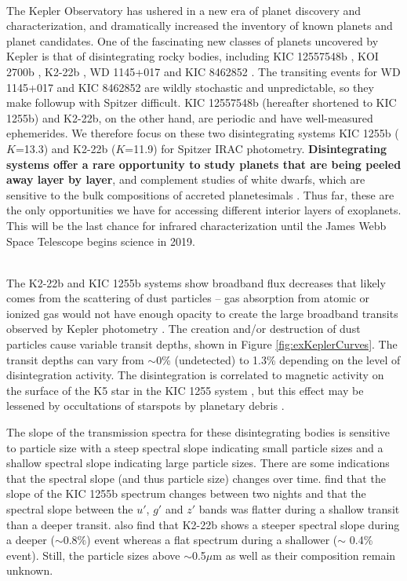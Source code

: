 \documentclass[letterpaper,12pt]{article}
\begin{document}
\\
The Kepler Observatory has ushered in a new era of planet discovery and characterization, and dramatically increased the inventory of known planets and planet candidates.
One of the fascinating new classes of planets uncovered by Kepler is that of disintegrating rocky bodies,
including KIC 12557548b \citep{rappaport}, KOI 2700b \citep{rappaport2014KOI2700}, K2-22b \citep{sanchis-ojedak2-22}, WD 1145+017 \citep{vanderburg2015wdDisintegrating} and KIC 8462852 \citep{boyajian846}.
The transiting events for WD 1145+017 and KIC 8462852 are wildly stochastic and unpredictable, so they make followup with Spitzer difficult.
KIC 12557548b (hereafter shortened to KIC 1255b) and K2-22b, on the other hand, are periodic and have well-measured ephemerides.
We therefore focus on these two disintegrating systems KIC 1255b ($K$=13.3) and K2-22b ($K$=11.9) for Spitzer IRAC photometry.
\textbf{Disintegrating systems offer a rare opportunity to study planets that are being peeled away layer by layer}, and complement studies of white dwarfs, which are sensitive to the bulk compositions of accreted planetesimals \cite[e.g.][]{jura2003wdPollution}.
Thus far, these are the only opportunities we have for accessing different interior layers of exoplanets.
This will be the last chance for infrared characterization until the James Webb Space Telescope begins science in 2019.\newline

\\
The K2-22b and KIC 1255b systems show broadband flux decreases that likely comes from the scattering of dust particles -- gas absorption from atomic or ionized gas would not have enough opacity to create the large broadband transits observed by Kepler photometry \citep[0.42 $\mu$m to 0.90 $\mu$m bandpass;][]{koch2010keplerChar}.
The creation and/or destruction of dust particles cause variable transit depths, shown in Figure \ref{fig:exKeplerCurves}.
The transit depths can vary from $\sim$0\% (undetected) to 1.3\% depending on the level of disintegration activity.
The disintegration is correlated to magnetic activity on the surface of the K5 star in the KIC 1255 system \citep{kawahara2013starspots}, but this effect may be lessened by occultations of starspots by planetary debris \citep{croll2015starspots}.

The slope of the transmission spectra for these disintegrating bodies is sensitive to particle size with a steep spectral slope indicating small particle sizes and a shallow spectral slope indicating large particle sizes.
There are some indications that the spectral slope (and thus particle size) changes over time.
\citet{bochinski2015evolving} find that the slope of the KIC 1255b spectrum changes between two nights and that the spectral slope between the $u'$, $g'$ and $z'$ bands was flatter during a shallow transit than a deeper transit. 
\cite{sanchis-ojedak2-22} also find that K2-22b shows a steeper spectral slope during a deeper ($\sim 0.8\%$) event whereas a flat spectrum during a shallower ($\sim$ 0.4\% event).
Still, the particle sizes above $\sim$0.5$\mu$m as well as their composition remain unknown.
\end{document}
